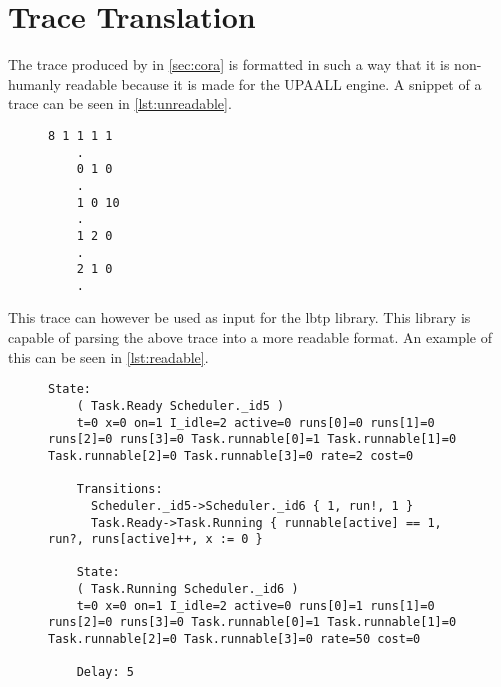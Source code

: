 \section{Trace Translation} \label{sec:trace_trans}
The trace produced by in \cref{sec:cora} is formatted in such a way that it is non-humanly readable because it is made for the UPAALL engine. A snippet of a trace can be seen in \cref{lst:unreadable}.
\begin{figure}[H]
\begin{lstlisting}[caption={Non-humanly readable trace}, label=lst:unreadable, language=text]
	8 1 1 1 1 
	.
	0 1 0
	.
	1 0 10
	.
	1 2 0
	.
	2 1 0
	.
\end{lstlisting}
\end{figure}
This trace can however be used as input for the \gls{lbtp}\cite{libutap} library.
This library is capable of parsing the above trace into a more readable format.
An example of this can be seen in \cref{lst:readable}.
\begin{figure}[H]
\begin{lstlisting}[caption={Humanly readable trace}, label=lst:readable, language=text]
	State:
	( Task.Ready Scheduler._id5 )
	t=0 x=0 on=1 I_idle=2 active=0 runs[0]=0 runs[1]=0 runs[2]=0 runs[3]=0 Task.runnable[0]=1 Task.runnable[1]=0 Task.runnable[2]=0 Task.runnable[3]=0 rate=2 cost=0
	
	Transitions:
	  Scheduler._id5->Scheduler._id6 { 1, run!, 1 }
	  Task.Ready->Task.Running { runnable[active] == 1, run?, runs[active]++, x := 0 }
	
	State:
	( Task.Running Scheduler._id6 )
	t=0 x=0 on=1 I_idle=2 active=0 runs[0]=1 runs[1]=0 runs[2]=0 runs[3]=0 Task.runnable[0]=1 Task.runnable[1]=0 Task.runnable[2]=0 Task.runnable[3]=0 rate=50 cost=0
	
	Delay: 5
\end{lstlisting}
\end{figure}

